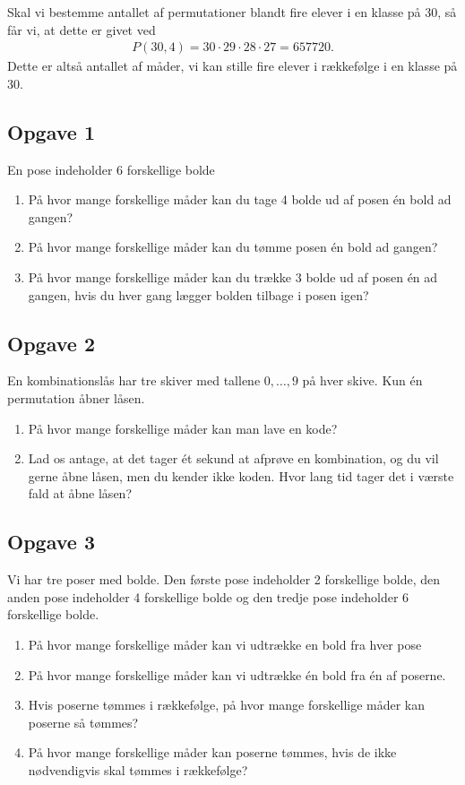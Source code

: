 \begin{exa}
	Skal vi bestemme antallet af permutationer blandt fire elever i en klasse på 30, så får vi, at dette er givet ved
	\begin{align*}
		P(30,4) = 30\cdot 29 \cdot 28 \cdot 27 = 657720.
	\end{align*}
	Dette er altså antallet af måder, vi kan stille fire elever i rækkefølge i en klasse på 30. 
\end{exa}


\subsection*{Opgave 1}
En pose indeholder 6 forskellige bolde
\begin{enumerate}[label=\roman*)]
	\item På hvor mange forskellige måder kan du tage 4 bolde ud af posen én bold ad gangen?
	\item På hvor mange forskellige måder kan du tømme posen én bold ad gangen?
	\item På hvor mange forskellige måder kan du trække 3 bolde ud af posen én ad gangen, hvis du hver gang lægger bolden tilbage i posen igen?
\end{enumerate}




\subsection*{Opgave 2}
En kombinationslås har tre skiver med tallene $0,\hdots, 9$ på hver skive. Kun én permutation åbner låsen.
\begin{enumerate}[label=\roman*)]
\item På hvor mange forskellige måder kan man lave en kode?
\item Lad os antage, at det tager ét sekund at afprøve en kombination, og du vil gerne åbne låsen, men du kender ikke koden. Hvor lang tid tager det i værste fald at åbne låsen?
\end{enumerate}

\subsection*{Opgave 3}
Vi har tre poser med bolde. Den første pose indeholder 2 forskellige bolde, den anden pose indeholder 4 forskellige bolde og den tredje pose indeholder 6 forskellige bolde. 

\begin{enumerate}[label=\roman*)]
	\item På hvor mange forskellige måder kan vi udtrække en bold fra hver pose
	\item På hvor mange forskellige måder kan vi udtrække én bold fra én af poserne. 
	\item Hvis poserne tømmes i rækkefølge, på hvor mange forskellige måder kan poserne så tømmes?
	\item På hvor mange forskellige måder kan poserne tømmes, hvis de ikke nødvendigvis skal tømmes i rækkefølge?
\end{enumerate}

